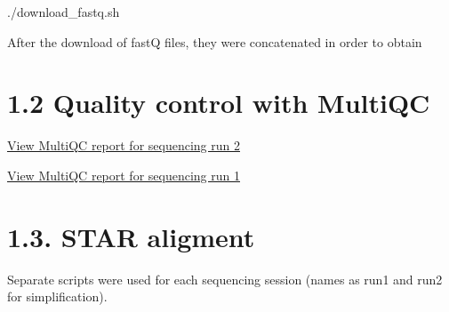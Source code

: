\documentclass[
  letterpaper,
  DIV=11,
  numbers=noendperiod]{scrreprt}
\newenvironment{Shaded}{\begin{snugshade}}{\end{snugshade}}
\newcommand{\ExtensionTok}[1]{\textcolor[rgb]{0.00,0.23,0.31}{#1}}
\begin{document}
\begin{Shaded}
\begin{Highlighting}[]
\ExtensionTok{./download\_fastq.sh}
\end{Highlighting}
\end{Shaded}

After the download of fastQ files, they were concatenated in order to
obtain

\section{1.2 Quality control with
MultiQC}\label{quality-control-with-multiqc}

\href{fastQC/run1/multiqc_report.html}{View MultiQC report for
sequencing run 2}

\href{fastQC/run2/multiqc_report.html}{View MultiQC report for
sequencing run 1}

\section{1.3. STAR aligment}\label{star-aligment}

Separate scripts were used for each sequencing session (names as run1
and run2 for simplification).
\end{document}
